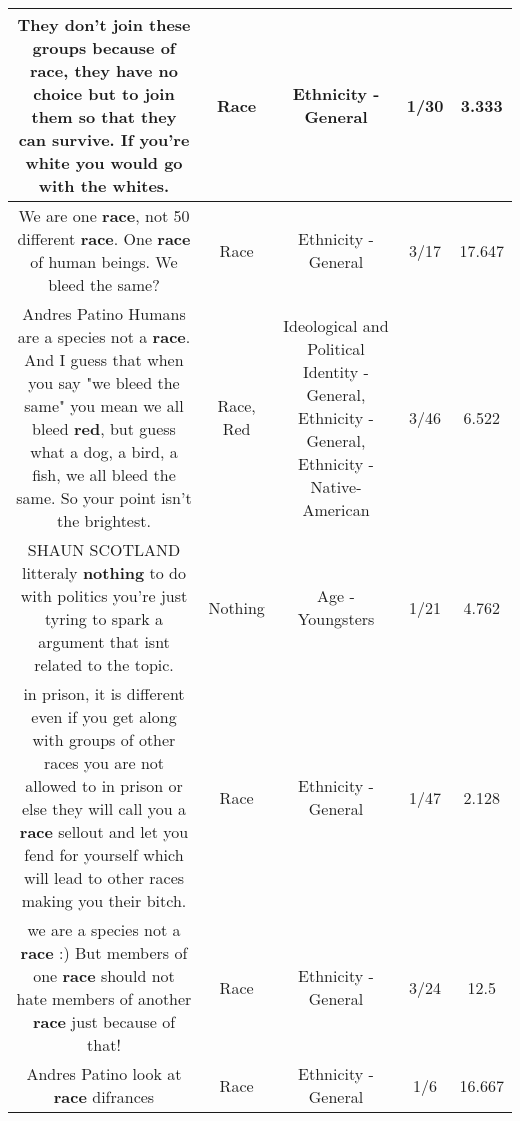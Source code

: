 \documentclass[11pt]{article}
\newlength\mylength
\begin{document}
\begin{center}
\begin{longtable}{|C{.65\mylength}|C{.30\mylength}|C{.12\mylength}|C{.12\mylength}|C{.12\mylength}|}
  \small They don't join these groups because of \textbf{race}, they have no choice but to join them so that they can survive. If you're white you would go with the whites.\normalsize   & Race & Ethnicity - General & 1/30 & 3.333 \\  \hline
  \small We are one \textbf{race}, not 50 different \textbf{race}. One \textbf{race} of human beings. We bleed the same?\normalsize   & Race & Ethnicity - General & 3/17 & 17.647 \\  \hline
  \small Andres Patino Humans are a species not a \textbf{race}. And I guess that when you say "we bleed the same" you mean we all bleed \textbf{r\textbf{ed}}, but guess what a dog, a bird, a fish, we all bleed the same. So your point isn't the brightest.\normalsize   & Race, Red &  Ideological and Political Identity - General, Ethnicity - General, Ethnicity - Native-American & 3/46 & 6.522 \\  \hline
  \small SHAUN SCOTLAND litteraly \textbf{nothing} to do with politics you're just tyring to spark a argument that isnt related to the topic.\normalsize   & Nothing & Age - Youngsters & 1/21 & 4.762 \\  \hline
  \small in prison, it is different even if you get along with groups of other races you are not allowed to in prison or else they will call you a \textbf{race} sellout and let you fend for yourself which will lead to other races making you their bitch.\normalsize   & Race & Ethnicity - General & 1/47 & 2.128 \\  \hline
  \small we are a species not a \textbf{race} :) But members of one \textbf{race} should not hate members of another \textbf{race} just because of that!\normalsize   & Race & Ethnicity - General & 3/24 & 12.5 \\  \hline
  \small Andres Patino look at \textbf{race} difrances\normalsize   & Race & Ethnicity - General & 1/6 & 16.667 \\  \hline

\end{longtable}
\end{center}
\end{document}
